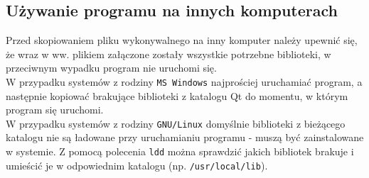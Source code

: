 \documentclass[12pt,a4paper]{article}
\begin{document}
	\subsection{Używanie programu na innych komputerach}
	Przed skopiowaniem pliku wykonywalnego na inny komputer należy upewnić się,
	że wraz w ww. plikiem załączone zostały wszystkie potrzebne biblioteki, w
	przeciwnym wypadku program nie uruchomi się.\\
	
	W przypadku systemów z rodziny \texttt{MS Windows} najprościej uruchamiać
	program, a następnie kopiować brakujące biblioteki z katalogu Qt do momentu, w
	którym program się uruchomi.\\
	
	W przypadku systemów z rodziny \texttt{GNU/Linux} domyślnie biblioteki z 
	bieżącego katalogu nie są ładowane przy uruchamianiu programu - muszą być
	zainstalowane w systemie. Z pomocą polecenia \texttt{ldd} można sprawdzić
	jakich bibliotek brakuje i umieścić je w odpowiednim katalogu (np. \texttt{/usr/local/lib}).
\end{document}

